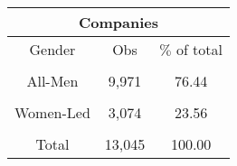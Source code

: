  \begin{table}[htbp]\centering
    \begin{tabular}{c c c }
    \toprule
    \multicolumn{3}{c}{\textbf{Companies}}  \\
    \midrule
    Gender      &      Obs      &     $\%$ of total\\
                &               &                  \\
    All-Men    &      9,971    &       76.44      \\
                &               &                  \\
    Women-Led  &      3,074    &       23.56      \\
                &               &                  \\
    Total       &      13,045   &       100.00     \\
    \bottomrule
    \end{tabular}
\end{table}